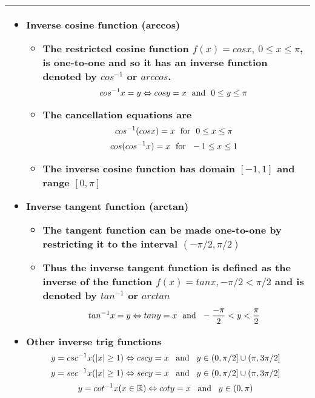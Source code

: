 \documentclass[fleqn]{article}
\begin{document}
\begin{center}
{\begin{tabularx}{.9\textwidth}{|X|}
\begin{itemize}
	\item \textbf{Inverse cosine function (arccos)}
	\begin{itemize}
		\item The restricted cosine function $f(x) = cos x, \: 0 \le x \le \pi$, is one-to-one and so it has an inverse function denoted by $cos^{-1}$ or $arccos$.
		$$cos^{-1} x = y \Leftrightarrow cos y = x \text{\hspace{3pt} and \hspace{3pt}} 0 \le y \le \pi$$
		\item The cancellation equations are
		$$cos^{-1}(cosx) = x \text{\hspace{3pt} for \hspace{3pt}} 0 \le x \le \pi$$
		$$cos(cos^{-1}x) = x \text{\hspace{3pt} for \hspace{3pt}} -1 \le x \le 1$$
		\item The inverse cosine function has domain $[-1, 1]$ and range $[0,\pi]$
	\end{itemize}
	\vspace{5pt}

	\item \textbf{Inverse tangent function (arctan)}
	\begin{itemize}
		\item The tangent function can be made one-to-one by restricting it to the interval $(-\pi/2, \pi/2)$
		\item Thus the inverse tangent function is defined as the inverse of the function $f(x) = tan x, -\pi/2 < \pi/2$ and is denoted by $tan^{-1}$ or $arctan$
	$$tan^{-1} x = y \Leftrightarrow tan y = x \text{\hspace{3pt} and \hspace{3pt}} -\dfrac{-\pi}{2} < y < \dfrac{\pi}{2}$$
	\end{itemize}
	\vspace{5pt}

	\item \textbf{Other inverse trig functions}
		$$y = csc^{-1} x(|x| \ge 1) \Leftrightarrow csc y = x \text{\hspace{5pt} and \hspace{5pt}} y \in (0, \pi/2] \cup (\pi, 3\pi/2]$$
		$$y = sec^{-1} x(|x| \ge 1) \Leftrightarrow sec y = x \text{\hspace{5pt} and \hspace{5pt}} y \in (0, \pi/2] \cup (\pi, 3\pi/2]$$
		$$y = cot^{-1} x(x \in \mathbb{R}) \Leftrightarrow cot y = x \text{\hspace{5pt} and \hspace{5pt}} y \in (0, \pi)$$
	\end{itemize} \\
\hline
\end{tabularx}}
\vspace{12pt}	

\end{center}
\end{document}
